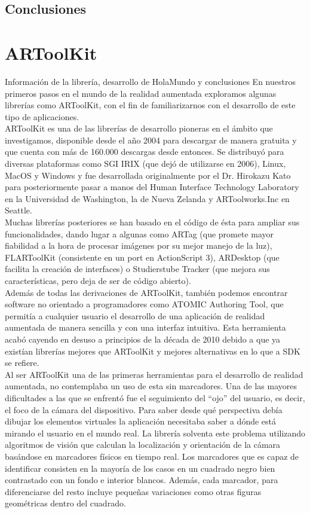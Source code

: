 \subsection{Conclusiones}


\section{ARToolKit}
Información de la librería, desarrollo de HolaMundo y conclusiones
En nuestros primeros pasos en el mundo de la realidad aumentada exploramos algunas librerías como ARToolKit, con el fin de familiarizarnos con el desarrollo de este tipo de aplicaciones.\\
ARToolKit es una de las librerías de desarrollo pioneras en el ámbito que investigamos, disponible desde el año 2004 para descargar de manera gratuita y que cuenta con más de 160.000 descargas desde entonces. Se distribuyó para diversas plataformas como SGI IRIX (que dejó de utilizarse en 2006), Linux, MacOS y Windows y fue desarrollada originalmente por el Dr. Hirokazu Kato para posteriormente pasar a manos del Human Interface Technology Laboratory en la Universidad de Washington, la de Nueva Zelanda y ARToolworks.Inc en Seattle.\\

Muchas librerías posteriores se han basado en el código de ésta para ampliar sus funcionalidades, dando lugar a algunas como ARTag (que promete mayor fiabilidad a la hora de procesar imágenes por su mejor manejo de la luz), FLARToolKit (consistente en un port en ActionScript 3), ARDesktop (que facilita la creación de interfaces) o Studierstube Tracker (que mejora sus características, pero deja de ser de código abierto).\\
Además de todas las derivaciones de ARToolKit, también podemos encontrar software no orientado a programadores como ATOMIC Authoring Tool, que permitía a cualquier usuario el desarrollo de una aplicación de realidad aumentada de manera sencilla y con una interfaz intuitiva. Esta herramienta acabó cayendo en desuso a principios de la década de 2010 debido a que ya existían librerías mejores que ARToolKit y mejores alternativas en lo que a SDK se refiere.\\

Al ser ARToolKit una de las primeras herramientas para el desarrollo de realidad aumentada, no contemplaba un uso de esta sin marcadores. Una de las mayores dificultades a las que se enfrentó fue el seguimiento del “ojo” del usuario, es decir, el foco de la cámara del dispositivo. Para saber desde qué perspectiva debía dibujar los elementos virtuales la aplicación necesitaba saber a dónde está mirando el usuario en el mundo real. La librería solventa este problema utilizando algoritmos de visión que calculan la localización y orientación de la cámara basándose en marcadores físicos en tiempo real.
Los marcadores que es capaz de identificar consisten en la mayoría de los casos en un cuadrado negro bien contrastado con un fondo e interior blancos. Además, cada marcador, para diferenciarse del resto incluye pequeñas variaciones como otras figuras geométricas dentro del cuadrado.\\

